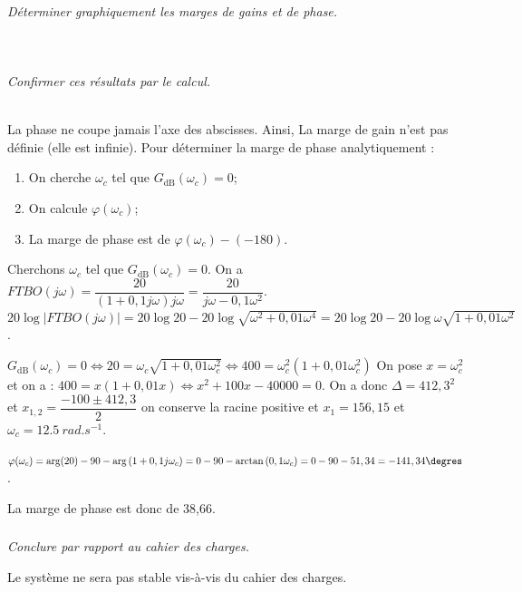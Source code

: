 \documentclass[10pt,fleqn]{article} %
\begin{document}
\begin{multicols}{2}
\subparagraph{}\textit{Déterminer graphiquement les marges de gains et de phase.}
\ifprof
\begin{corrige}~\\
\end{corrige}
\else
\fi

\subparagraph{}\textit{Confirmer ces résultats par le calcul.}
\ifprof
\begin{corrige}~\\
La phase ne coupe jamais l'axe des abscisses. Ainsi, La marge de gain n'est pas définie (elle est infinie).
Pour déterminer la marge de phase analytiquement :
\begin{enumerate}
\item On cherche $\omega_c$ tel que $G_{\text{dB}}(\omega_c)=0$;
\item On calcule $\varphi(\omega_c)$;
\item La marge de phase est de $\varphi(\omega_c) -(-180)$.
\end{enumerate}

Cherchons $\omega_c$ tel que $G_{\text{dB}}(\omega_c)=0$. 
On a $FTBO(j\omega )
=\dfrac{20}{(1+0,1j\omega)j\omega}
=\dfrac{20}{j\omega-0,1\omega^2}$. 
$20\log |FTBO(j\omega )| 
= 20\log 20 - 20\log \sqrt{\omega^2+0,01\omega^4}
= 20\log 20 - 20\log \omega\sqrt{1+0,01\omega^2}$.

 $G_{\text{dB}}(\omega_c)=0 
\Leftrightarrow   20 =\omega_c\sqrt{1+0,01\omega_c^2} 
\Leftrightarrow   400 =\omega_c^2 \left(1+0,01\omega_c^2\right)$
On pose $x=\omega_c^2$ et on a :
$400 =x \left(1+0,01x\right)\Leftrightarrow x^2+100x-40000=0$. 
On a donc $\Delta = 412,3^2$ et $x_{1,2}=\dfrac{-100\pm412,3}{2}$ on conserve la racine positive et  $x_1=156,15$ et $\omega_c=\SI{12,5}{rad.s^{-1}}$.

$\varphi(\omega_c)=\arg(20)-90 -\arg\left(1+0,1j\omega_c \right)
=0- 90 -\arctan\left( 0,1\omega_c \right)
=0-90-51,34=-141,34\degres$.

La marge de phase est donc de 38,66\degres.
\end{corrige}
\else
\fi

\subparagraph{}\textit{Conclure par rapport au cahier des charges.}
\ifprof
\begin{corrige}
Le système ne sera pas stable vis-à-vis du cahier des charges.
\end{corrige}
\else
\fi


\end{multicols}
\end{document}
